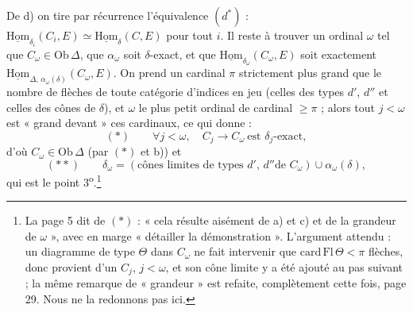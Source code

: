 \documentclass[11pt,a4paper]{article}
\begin{document}
De d) on tire par récurrence l'équivalence $(d^{*})$ :
$\underline{\mathrm{Hom}}_{\delta_{i}}(C_{i}, E) \simeq
\underline{\mathrm{Hom}}_{\delta}(C, E)$ pour tout $i$. Il reste à trouver
un ordinal $\omega$ tel que $C_{\omega} \in \mathrm{Ob}\,\Delta$, que
$\alpha_{\omega}$ soit $\delta$-exact, et que
$\underline{\mathrm{Hom}}_{\delta_{\omega}}(C_{\omega}, E)$ soit exactement
$\underline{\mathrm{Hom}}_{\Delta,\,\alpha_{\omega}(\delta)}(C_{\omega}, E)$.
On prend un cardinal $\pi$ strictement plus grand que le nombre de flèches
de toute catégorie d'indices en jeu (celles des types $d'$, $d''$ et celles
des cônes de $\delta$), et $\omega$ le plus petit ordinal de cardinal
$\geqslant \pi$ ; alors tout $j < \omega$ est « grand devant » ces
cardinaux, ce qui donne :
\[
(*) \qquad \forall j < \omega,\quad C_{j} \to C_{\omega}
\ \text{est } \delta_{j}\text{-exact},
\]
d'où $C_{\omega} \in \mathrm{Ob}\,\Delta$ (par $(*)$ et b)) et
\[
(**) \qquad \delta_{\omega} = (\text{cônes limites de types $d'$, $d''$
de } C_{\omega}) \cup \alpha_{\omega}(\delta),
\]
qui est le point 3\textsuperscript{o}.\footnote{La page 5 dit de $(*)$ :
« cela résulte aisément de a) et c) et de la grandeur de $\omega$ », avec
en marge « détailler la démonstration ». L'argument attendu : un diagramme
de type $\Theta$ dans $C_{\omega}$ ne fait intervenir que
$\mathrm{card}\,\mathrm{Fl}\,\Theta < \pi$ flèches, donc provient d'un
$C_{j}$, $j < \omega$, et son cône limite y a été ajouté au pas suivant ;
la même remarque de « grandeur » est refaite, complètement cette fois, page
29. Nous ne la redonnons pas ici.}
\end{document}
